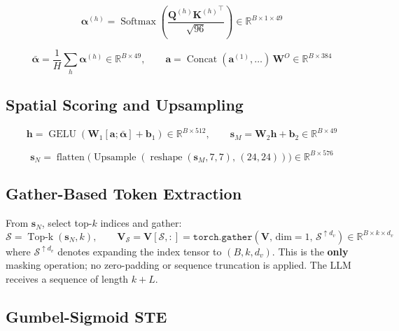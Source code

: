 \documentclass[11pt,a4paper]{article}
\DeclareMathOperator{\Softmax}{Softmax}
\DeclareMathOperator{\TopK}{Top\text{-}k}
\DeclareMathOperator{\Concat}{Concat}
\DeclareMathOperator{\Upsample}{Upsample}
\DeclareMathOperator{\reshape}{reshape}
\DeclareMathOperator{\flatten}{flatten}
\DeclareMathOperator{\GELU}{GELU}
\newcommand{\R}{\mathbb{R}}
\newcommand{\vs}{\mathbf{s}}
\newcommand{\mV}{\mathbf{V}}
\begin{document}
\begin{equation}
  \boldsymbol{\alpha}^{(h)} = \Softmax\!\!\left(
    \frac{\mathbf{Q}^{(h)}{\mathbf{K}^{(h)}}^\top}{\sqrt{96}}
  \right) \in \R^{B \times 1 \times 49}
\end{equation}

\begin{equation}
  \bar{\boldsymbol{\alpha}} = \frac{1}{H}\sum_h \boldsymbol{\alpha}^{(h)}
  \in \R^{B \times 49}, \qquad
  \mathbf{a} = \Concat(\mathbf{a}^{(1)},\ldots)\,\mathbf{W}^O
  \in \R^{B \times 384}
\end{equation}

\subsection{Spatial Scoring and Upsampling}

\begin{equation}
  \mathbf{h} = \GELU(\mathbf{W}_1[\mathbf{a};\bar{\boldsymbol{\alpha}}] + \mathbf{b}_1)
  \in \R^{B \times 512}, \qquad
  \vs_M = \mathbf{W}_2\mathbf{h} + \mathbf{b}_2 \in \R^{B \times 49}
\end{equation}

\begin{equation}
  \vs_N = \flatten\!\bigl(\Upsample(\reshape(\vs_M, 7,7),\,(24,24))\bigr)
  \in \R^{B \times 576}
\end{equation}

\subsection{Gather-Based Token Extraction}

From $\vs_N$, select top-$k$ indices and gather:
\begin{equation}
  \mathcal{S} = \TopK(\vs_N, k), \qquad
  \mV_\mathcal{S} = \mV[\mathcal{S}, :]
  = \texttt{torch.gather}(\mV,\, \text{dim}{=}1,\, \mathcal{S}^{\uparrow d_v})
  \in \R^{B \times k \times d_v}
  \label{eq:gather}
\end{equation}
where $\mathcal{S}^{\uparrow d_v}$ denotes expanding the index tensor to
$(B, k, d_v)$.
This is the \textbf{only} masking operation; no zero-padding or sequence
truncation is applied. The LLM receives a sequence of length $k{+}L$.

\subsection{Gumbel-Sigmoid STE}
\end{document}
